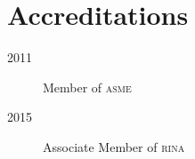 \section*{Accreditations} %
\label{sec:ce}

\begin{description}
	\item[2011]Member of \textsc{asme}
	\item[2015]Associate Member of \textsc{rina}  
\end{description}

